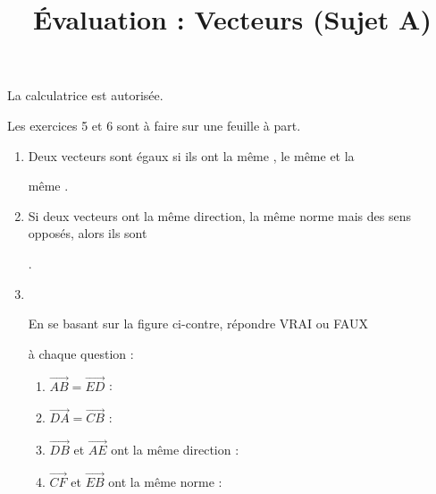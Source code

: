 \documentclass[
	classe=$2^{de}$
]{évaluation}
\author{}
\date{}
\begin{document}
\title{Évaluation : Vecteurs (Sujet A)}
\maketitle

\begin{tcolorbox}
	La calculatrice est autorisée.

	Les exercices 5 et 6 sont à faire sur une feuille à part.
\end{tcolorbox}

\begin{exercice}
	\begin{enumerate}
		\item Deux vecteurs sont égaux si ils ont la même , le même  et la

		      même .
		\item Si deux vecteurs ont la même direction, la même norme mais des sens opposés, alors ils sont

		      .
		\item \

		      \begin{minipage}{0.7\linewidth}
			      En se basant sur la figure ci-contre, répondre VRAI ou FAUX

			      à chaque question :
		      \end{minipage}
		      \begin{minipage}{0.25\linewidth}
		      \end{minipage}
		      \begin{multicols}{2}
			      \begin{enumerate}
				      \item $\vec{AB} = \vec{ED}$ : 
				      \item $\vec{DA} = \vec{CB}$ : 
				      \item $\vec{DB}$ et $\vec{AE}$ ont la même direction : 
				      \item $\vec{CF}$ et $\vec{EB}$ ont la même norme : 
			      \end{enumerate}
		      \end{multicols}
	\end{enumerate}
\end{exercice}
\end{document}
